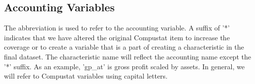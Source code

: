 \documentclass[12pt,title,fleqn]{article}
\begin{document}
\subsection{Accounting Variables}
The abbreviation is used to refer to the accounting variable. A suffix of '\mbox{*}' indicates that we have altered the original Compustat item to increase the coverage or to create a variable that is a part of creating a characteristic in the final dataset. The characteristic name will reflect the accounting name except the '\mbox{*}' suffix. As an example, 'gp\_at' is gross profit scaled by assets. In general, we will refer to Compustat variables using capital letters.   

\setlength\LTcapwidth{\textwidth} %

\setlength\LTleft{0pt}            %
\setlength\LTright{0pt}           %
\end{document}
